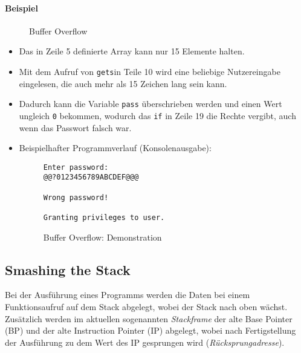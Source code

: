         \paragraph{Beispiel}
            \begin{figure}[H]
            	\centering
            	
            	\caption{Buffer Overflow}
            \end{figure}
            \begin{itemize}
            	\item Das in Zeile 5 definierte Array kann nur 15 Elemente halten.
            	\item Mit dem Aufruf von \texttt{gets}in Teile 10 wird eine beliebige Nutzereingabe eingelesen, die auch mehr als 15 Zeichen lang sein kann.
            	\item Dadurch kann die Variable \texttt{pass} überschrieben werden und einen Wert ungleich \texttt{0} bekommen, wodurch das \texttt{if} in Zeile 19 die Rechte vergibt, auch wenn das Passwort falsch war.
            	\item Beispielhafter Programmverlauf (Konsolenausgabe):
	            	\begin{figure}[H]
	            		\centering
	            		\begin{lstlisting}[numbers = none]
Enter password:
@@?0123456789ABCDEF@@@

Wrong password!

Granting privileges to user.
\end{lstlisting}
	            		\caption{Buffer Overflow: Demonstration}
	            	\end{figure}
            \end{itemize}

        \subsection{Smashing the Stack}
            Bei der Ausführung eines Programms werden die Daten bei einem Funktionsaufruf auf dem Stack abgelegt, wobei der Stack nach oben wächst. Zusätzlich werden im aktuellen sogenannten \textit{Stackframe} der alte Base Pointer (BP) und der alte Instruction Pointer (IP) abgelegt, wobei nach Fertigstellung der Ausführung zu dem Wert des IP gesprungen wird (\textit{Rücksprungadresse}).
            
